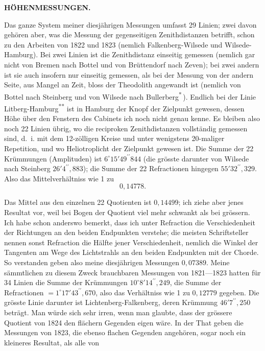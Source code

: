 \par\clearpage
\noindent\null\hfill{\small\textbf{HÖHENMESSUNGEN.}}\hfill{}\par\medskip
\par\noindent\hspace*{\parindent}Das ganze System meiner diesjährigen Messungen umfasst 29 Linien;
zwei davon gehören aber, was die Messung der gegenseitigen Zenithdistanzen
betrifft, schon zu den Arbeiten von 1822 und 1823 (nemlich Falkenberg-Wilsede
und Wilsede-Hamburg). Bei zwei Linien ist die Zenithdistanz  einseitig
gemessen (nemlich gar nicht von Bremen nach Bottel und von Brüttendorf
nach Zeven); bei zwei andern ist sie auch insofern nur einseitig gemessen,
als bei der Messung von der andern Seite, aus Mangel an Zeit, bloss der
Theodolith angewandt ist (nemlich von Bottel nach Steinberg und von Wilsede
nach Bullerberg\textsuperscript{*}\,). Endlich bei der Linie Litberg-Hamburg\textsuperscript{**} ist in Hamburg
der Knopf der Zielpunkt gewesen, dessen Höhe über den Fenstern des Cabinets ich noch nicht genau kenne. Es bleiben also noch 22 Linien übrig, wo
die reciproken Zenithdistanzen vollständig gemessen sind, d.~i. mit dem 12-zölligen Kreise und unter wenigstens 20-maliger Repetition, und wo  Heliotroplicht der Zielpunkt gewesen ist. Die Summe der 22 Krümmungen (Amplituden) ist \(6^\circ15'49^{\prime\prime}844\) (die grösste darunter von Wilsede nach
Steinberg \(26'4^{\prime\prime}{,}883\)); die Summe der 22 Refractionen hingegen \(55'32^{\prime\prime}{,}329\).
Also das Mittelverhältniss wie 1 zu
\[0{,}14778.\]
\par\noindent\hspace*{\parindent}Das Mittel aus den einzelnen 22 Quotienten ist \(0{,}14499\); ich ziehe aber
jenes Resultat vor, weil bei  Bogen der Quotient viel mehr schwankt
als bei grössern. Ich habe schon anderswo bemerkt, dass ich unter Refraction
die Verschiedenheit der Richtungen an den beiden Endpunkten verstehe; die
meisten Schriftsteller nennen sonst Refraction die Hälfte jener Verschiedenheit,
nemlich die Winkel der Tangenten am Wege des Lichtstrahls an den beiden
Endpunkten mit der Chorde. So verstanden geben also meine diesjährigen
Messungen \(0{,}07389\). Meine sämmtlichen zu diesem Zweck brauchbaren Messungen von 1821---1823 hatten für 34 Linien die Summe der Krümmungen
\(10^\circ8'14^{\prime\prime}{,}249\), die Summe der Refractionen \(=1^\circ17'43^{\prime\prime}{,}670\), also das Verhältniss wie 1 zu \(0{,}12779\) gegeben. Die grösste Linie darunter ist Lichtenberg-Falkenberg, deren Krümmung \(46'7^{\prime\prime}{,}250\) beträgt. Man würde sich sehr irren,
wenn man glaubte, dass der grössere Quotient von 1824 den flächern Gegenden eigen wäre. In der That geben die Messungen von 1823, die ebenso
flachen Gegenden angehören, sogar noch ein kleineres Resultat, als alle von
\par\medskip\noindent\hspace*{0.03\linewidth}{\footnotesize IX.}\hfill{}\par

